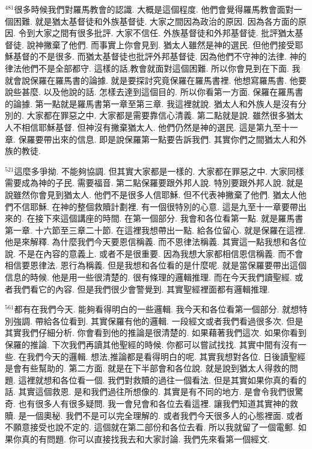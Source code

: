 \documentclass{book}
\begin{document}
$^{481}$很多時候我們對羅馬教會的認識.
大概是這個程度.
他們會覺得羅馬教會面對一個困難.
就是猶太基督徒和外族基督徒.
大家之間因為政治的原因.
因為各方面的原因.
令到大家之間有很多批評.
大家不信任.
外族基督徒和外邦基督徒.
批評猶太基督徒.
說神撇棄了他們.
而事實上你會見到.
猶太人雖然是神的選民.
但他們接受耶穌基督的不是很多.
而猶太基督徒也批評外邦基督徒.
因為他們不守神的法律.
神的律法他們不是全部都守.
這樣的話,教會就面對這個困難.
所以你會見到在下面.
我就會說保羅在羅馬書的論據.
就是要探討究竟保羅在羅馬書裡.
他想寫羅馬書.
他要說些甚麼.
以及他說的話.
怎樣去達到這個目的.
所以你看第一方面.
保羅在羅馬書的論據.
第一點就是羅馬書第一章至第三章.
我這裡就說.
猶太人和外族人是沒有分別的.
大家都在罪惡之中.
大家都是需要靠信心清義.
第二點就是說.
雖然很多猶太人不相信耶穌基督.
但神沒有撇棄猶太人.
他們仍然是神的選民.
這是第九至十一章.
保羅要帶出來的信息.
即是說保羅第一點要告訴我們.
其實你們之間猶太人和外族的教徒.

$^{521}$這麼多爭拗.
不能夠協調.
但其實大家都是一樣的.
大家都在罪惡之中.
大家同樣需要成為神的子民.
需要福音.
第二點保羅要跟外邦人說.
特別要跟外邦人說.
就是說雖然你會見到猶太人.
他們不是很多人信耶穌.
但不代表神撇棄了他們.
猶太人他們不信耶穌.
在神的整個救贖計劃裡.
有一個很特別的心意.
這是九至十一章要帶出來的.
在接下來這個講座的時間.
在第一個部分.
我會和各位看第一點.
就是羅馬書第一章.
十六節至三章二十節.
在這裡我想帶出一點.
給各位留心.
就是保羅在這裡.
他是來解釋.
為什麼我們今天要恩信稱義.
而不恩律法稱義.
其實這一點我想和各位說.
不是在內容的意義上.
或者不是很重要.
因為我想大家都相信恩信稱義.
而不會相信要恩律法.
恩行為稱義.
但是我想和各位看的是什麼呢.
就是當保羅要帶出這個信息的時候.
他是用一些很清楚的.
很有條理的邏輯推理.
而在今天我們讀聖經.
或者我們看它的內容.
但是我們很少會警覺到.
其實聖經裡面都有邏輯推理.

$^{561}$都有在我們今天.
能夠看得明白的一些邏輯.
我今天和各位看第一個部分.
就想特別強調.
帶給各位看到.
其實保羅有他的邏輯.
一段經文或者我們看過很多次.
但是其實我們仔細分析.
你會看到他的推論是很清楚的.
如果藉著我們這次.
如果你看到保羅的推論.
下次我們再讀其他聖經的時候.
你都可以嘗試找找.
其實中間有沒有一些.
在我們今天的邏輯.
想法,推論都是看得明白的呢.
其實我想對各位.
日後讀聖經是會有些幫助的.
第二方面.
就是在下半部會和各位說.
就是說到猶太人得救的問題.
這裡就想和各位看一個.
我們對救贖的過往一個看法.
但是其實如果你真的看的話.
其實這個救恩.
是和我們過往所想像的.
其實是有不同的地方.
是會令我們很驚奇.
也有很多人有很多疑問.
我一會兒會和各位去看這裡.
讓我們知道其實神的救贖.
是一個奧秘.
我們不是可以完全理解的.
或者我們今天很多人的心態裡面.
或者不願意接受也說不定的.
這個就在第二部份和各位去看.
所以我就留了一個電郵.
如果你真的有問題.
你可以直接找我去和大家討論.
我們先來看第一個經文.
\end{document}
